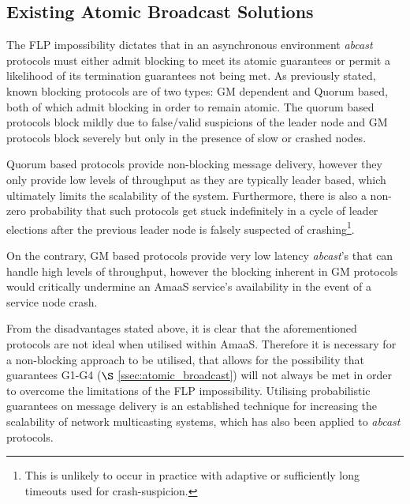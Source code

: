     \subsection{Existing Atomic Broadcast Solutions}
    The FLP impossibility \citep{Fischer:1985:IDC:3149.214121} dictates that in an asynchronous environment \emph{abcast} protocols must either admit blocking to meet its atomic guarantees or permit a likelihood of its termination guarantees not being met.  As  previously stated, known blocking protocols are of two types: GM dependent and Quorum based, both of which admit blocking in order to remain atomic.  The quorum based protocols block mildly due to false/valid suspicions of the leader node and GM protocols block severely but only in the presence of slow or crashed nodes.  
    
    Quorum based protocols provide non-blocking message delivery, however they only provide low levels of throughput as they are typically leader based, which ultimately limits the scalability of the system.  Furthermore, there is also a non-zero probability that such protocols get stuck indefinitely in a cycle of leader elections after the previous leader node is falsely suspected of crashing\footnote{This is unlikely to occur in practice with adaptive or sufficiently long timeouts used for crash-suspicion.}.  
    
    On the contrary, GM based protocols provide very low latency \emph{abcast}'s that can handle high levels of throughput, however the blocking inherent in GM protocols would critically undermine an \textsf{AmaaS} service's availability in the event of a service node crash.  
    
    From the disadvantages stated above, it is clear that the aforementioned protocols are not ideal when utilised within \textsf{AmaaS}.  Therefore it is necessary for a non-blocking approach to be utilised, that allows for the possibility that guarantees G1-G4 ($\S$ \ref{ssec:atomic_broadcast}) will not always be met in order to overcome the limitations of the FLP impossibility.  Utilising probabilistic guarantees on message delivery is an established technique for increasing the scalability of network multicasting systems\citep{Kermarrec:2003:PRD:766617.766623}, which has also been applied to \emph{abcast} protocols.  
    

